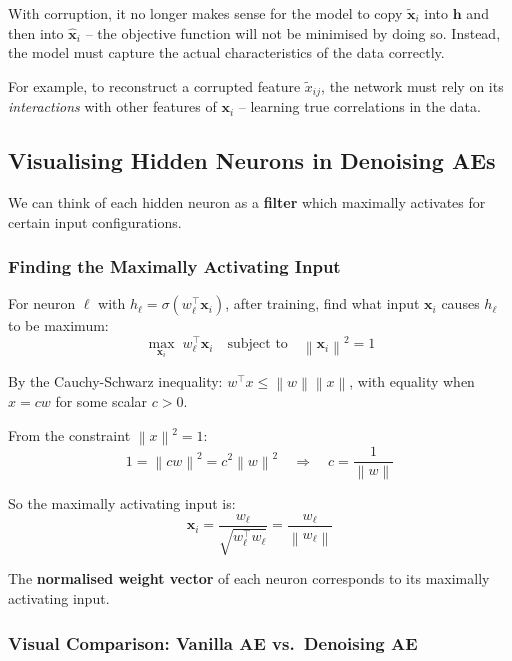 \documentclass[12pt,a4paper]{article}
\newcommand{\norm}[1]{\left\|#1\right\|}
\newcommand{\vx}{\mathbf{x}}
\newcommand{\vh}{\mathbf{h}}
\newcommand{\hatx}{\hat{\mathbf{x}}}
\begin{document}
\begin{alertbox}
With corruption, it no longer makes sense for the model to copy $\tilde{\vx}_i$ into $\vh$ and then into $\hatx_i$ -- the objective function will not be minimised by doing so. Instead, the model must capture the actual characteristics of the data correctly.

For example, to reconstruct a corrupted feature $\tilde{x}_{ij}$, the network must rely on its \emph{interactions} with other features of $\vx_i$ -- learning true correlations in the data.
\end{alertbox}

\subsection{Visualising Hidden Neurons in Denoising AEs}

We can think of each hidden neuron as a \textbf{filter} which maximally activates for certain input configurations.

\subsubsection{Finding the Maximally Activating Input}

For neuron $\ell$ with $h_\ell = \sigma(w_\ell^\top\vx_i)$, after training, find what input $\vx_i$ causes $h_\ell$ to be maximum:
\[
  \max_{\vx_i}\; w_\ell^\top\vx_i
  \quad\text{subject to}\quad
  \norm{\vx_i}^2 = 1
\]

By the Cauchy-Schwarz inequality: $w^\top x \leq \norm{w}\norm{x}$, with equality when $x = cw$ for some scalar $c > 0$.

From the constraint $\norm{x}^2 = 1$:
\[
  1 = \norm{cw}^2 = c^2\norm{w}^2
  \quad\Rightarrow\quad
  c = \frac{1}{\norm{w}}
\]

So the maximally activating input is:
\[
  \boxed{\vx_i = \frac{w_\ell}{\sqrt{w_\ell^\top w_\ell}} = \frac{w_\ell}{\norm{w_\ell}}}
\]

The \textbf{normalised weight vector} of each neuron corresponds to its maximally activating input.

\subsubsection{Visual Comparison: Vanilla AE vs.\ Denoising AE}
\end{document}
